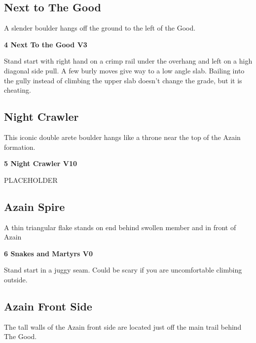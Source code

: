 \begin{multicols}{2}
			\subsection*{Next to The Good}\label{bf:Next to The Good}
			A slender boulder hangs off the ground to the left of the Good.
			
					\label{rt:Next To the Good} \colorbox{green!20}{\textbf{4 Next To the Good V3   \warn }}
					\begin{adjustwidth}{1cm}{}
					Stand start with right hand on a crimp rail under the overhang and left on a high diagonal side pull. A few burly moves give way to a low angle slab. Bailing into the gully instead of climbing the upper slab doesn't change the grade, but it is cheating.
					\end{adjustwidth}
			\subsection*{Night Crawler}\label{bf:Night Crawler}
			This iconic double arete boulder hangs like a throne near the top of the Azain formation.
			

					\label{rt:Night Crawler} \colorbox{red!20}{\textbf{5 Night Crawler V10  }}
					\begin{adjustwidth}{1cm}{}
					PLACEHOLDER
					\end{adjustwidth}
			\subsection*{Azain Spire}\label{bf:Azain Spire}
			A thin triangular flake stands on end behind swollen member and in front of Azain
			

					\label{rt:Snakes and Martyrs} \colorbox{green!20}{\textbf{6 Snakes and Martyrs V0 \ding{72}    }}
					\begin{adjustwidth}{1cm}{}
					 Stand start in a juggy seam. Could be scary if you are uncomfortable climbing outside.
					\end{adjustwidth}
			\subsection*{Azain Front Side}\label{bf:Azain Front Side}
			The tall walls of the Azain front side are located just off the main trail behind The Good.
			

\end{multicols}
